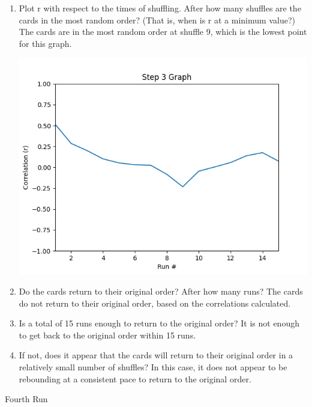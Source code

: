 \documentclass[12pt]{article}
\begin{document}
    \begin{enumerate}
        \item Plot r with respect to the times of shuffling. After how many shuffles are the cards 
        in the most random order? (That is, when is r at a minimum value?)
        \subitem The cards are in the most random order at shuffle 9, which is the lowest point for this graph.\\
        \begin{minipage}[t]{\linewidth}
            \centering
            {
              \includegraphics[width=.7\linewidth]{Figure_3.png}
            }
            \medskip       
        \end{minipage}
        \item Do the cards return to their original order?  After how many runs?
        \subitem The cards do not return to their original order, based on the correlations calculated.
        \item Is a total of 15 runs enough to return to the original order?
        \subitem It is not enough to get back to the original order within 15 runs.
        \item If not, does it appear that the cards will return to their original order in a relatively 
        small number of shuffles?
        \subitem In this case, it does not appear to be rebounding at a consistent pace to return to the original order.
    \end{enumerate}
    \newpage
    \begin{center}
        \small Fourth Run
    \end{center}
\end{document}
